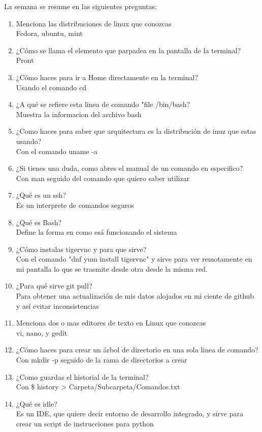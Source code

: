 \documentclass{book}
\begin{document}
La semana se resume en las siguientes preguntas:%
\begin{enumerate}%
	\item Menciona las distribuciones de linux que conozcas \\
	Fedora, ubuntu, mint	
	
	\item ¿Cómo se llama el elemento que parpadea en la pantalla de la terminal?\\
	Pront
	\item ¿Cómo haces para ir a Home directamente en la terminal?\\
	Usando el comando cd
	\item ¿A qué se refiere esta linea de comando "file /bin/bash?\\
	Muestra la informacion del archivo bash
	\item ¿Como haces para saber que arquitectura es la distribución de inuz que estas usando?\\
	Con el comando uname -a
	\item ¿Si tienes una duda, como abres el manual de un comando en especifico?\\
	Con man seguido del comando que quiero saber utilizar
	\item ¿Qué es un ssh?\\
	Es un interprete de comandos seguros
	\item ¿Qué es Bash?\\
	Define la forma en como esá funcionando el sistema
	
	\item ¿Cómo instalas tigervnc y para que sirve?\\
	Con el comando "dnf yum install tigervnc" y sirve para ver remotamente en mi pantalla lo que se trasmite desde otra desde la misma red.
	
	\item ¿Para qué sirve git pull?\\
	Para obtener una actualización de mis datos alojados en mi ciente de github y así evitar inconsistencias
	
	\item Menciona dos o mas editores de texto en Linux que conozcas\\
	vi, nano, y gedit
	\item ¿Cómo haces para crear un árbol de directorio en una sola linea de comando?\\
	Con mkdir -p seguido de la rama de directorios a crear
	\item ¿Como guardas el historial de la terminal?\\
	Con \$ history > Carpeta/Subcarpeta/Comandos.txt
	\item ¿Qué es idle?\\
	Es un IDE, que quiere decir entorno de desarrollo integrado, y sirve para crear un script de instrucciones para python
	

\end{enumerate}
\end{document}
